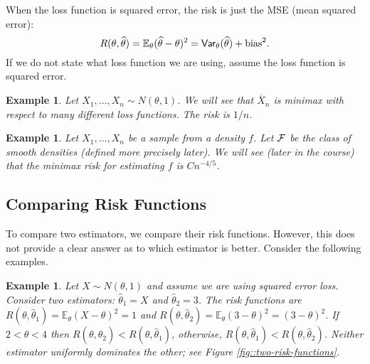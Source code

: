 \documentclass[twoside,12pt]{article}
\newcommand{\V}{\mbox{${\sf Var}$}}
\newtheorem{example}[theorem]{Example}
\newcommand\E{\mathbb{E}}
\begin{document}
When the loss function is squared error, the risk is just the 
MSE (mean squared error):
\begin{equation}
R(\theta,\widehat\theta) = \E_\theta ( \widehat\theta -\theta)^2 =
\V_\theta (\widehat\theta) + {\rm bias}^2.
\end{equation}
If we do not state what loss function we are using,
assume the loss function is squared error.

\vspace{1cm}


\vspace{1cm}

\begin{example}
Let $X_1,\ldots, X_n \sim N(\theta,1)$.
We will see that $\overline{X}_n$ is minimax with respect to
many different loss functions.
The risk is $1/n$.
\end{example}

\begin{example}
Let $X_1,\ldots, X_n$ be a sample from a density $f$.
Let ${\cal F}$ be the class of smooth densities
(defined more precisely later).
We will see (later in the course)
that the minimax risk for estimating $f$ is
$C n^{-4/5}$.
\end{example}




\subsection{Comparing Risk Functions}


To compare two estimators, we compare their risk functions.
However, this does not provide a clear
answer as to which estimator is better.
Consider the following examples.

\begin{example}\label{example::compare-two}
Let $X\sim N(\theta,1)$ and assume we are using squared error loss.
Consider two estimators:
$\widehat\theta_1 =X$ and
$\widehat\theta_2 =3$.
The risk functions are
$R(\theta,\widehat\theta_1)=\E_\theta (X-\theta)^2 =1$ and
$R(\theta,\widehat\theta_2)=\E_\theta (3-\theta)^2 = (3-\theta)^2.$
If $2 < \theta < 4$ then
$R(\theta,\widehat\theta_2)<R(\theta,\widehat\theta_1)$,
otherwise,
$R(\theta,\widehat\theta_1)<R(\theta,\widehat\theta_2)$.
Neither estimator uniformly dominates the other; see Figure
\ref{fig::two-risk-functions}.
\end{example}
\end{document}
